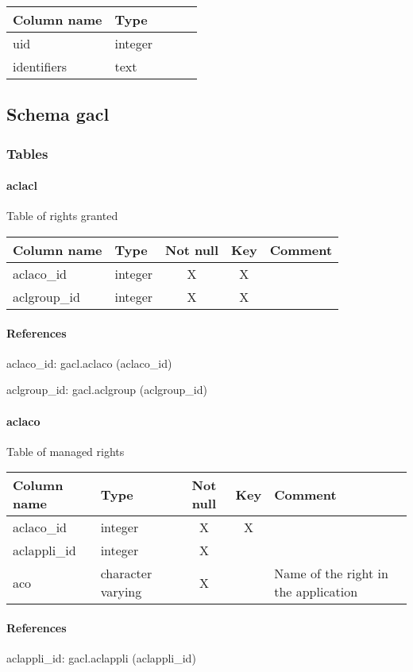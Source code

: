 \begin{tabular}{|l| p{2cm}|c|c| p{5cm}|}
\hline
Column name & Type \\
\hline
uid & integer\\
identifiers & text\\
\hline
\end{tabular}
\subsection{Schema gacl}
\subsubsection{Tables}
\paragraph{aclacl}
Table of rights granted

\begin{tabular}{|l| p{2cm}|c|c| p{5cm}|}
\hline
Column name & Type & Not null & Key & Comment \\
\hline
aclaco\_id & integer & X & X & \\
aclgroup\_id & integer & X & X & \\
\hline
\end{tabular}
\paragraph{References}
aclaco\_id: gacl.aclaco (aclaco\_id)

aclgroup\_id: gacl.aclgroup (aclgroup\_id)

\paragraph{aclaco}
Table of managed rights

\begin{tabular}{|l| p{2cm}|c|c| p{5cm}|}
\hline
Column name & Type & Not null & Key & Comment \\
\hline
aclaco\_id & integer & X & X & \\
aclappli\_id & integer & X &  & \\
aco & character varying & X &  & Name of the right in the application\\
\hline
\end{tabular}
\paragraph{References}
aclappli\_id: gacl.aclappli (aclappli\_id)


